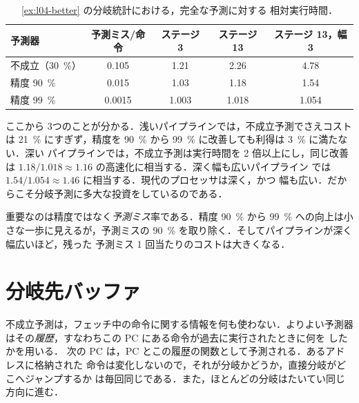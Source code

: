 \documentclass[../main.tex]{subfiles}
\begin{document}
\begin{table}[htbp]
  \centering\small
  \caption{\cref{ex:l04-better} の分岐統計における，完全な予測に対する
    相対実行時間．}
  \label{tab:l04-better}
  \begin{tabular}{@{}lcccc@{}}
    \toprule
    予測器 & 予測ミス/命令 & ステージ 3 & ステージ 13 & ステージ 13，幅 3 \\
    \midrule
    不成立（\SI{30}{\percent}） & 0.105  & 1.21  & 2.26  & 4.78 \\
    精度 \SI{90}{\percent}      & 0.015  & 1.03  & 1.18  & 1.54 \\
    精度 \SI{99}{\percent}      & 0.0015 & 1.003 & 1.018 & 1.054 \\
    \bottomrule
  \end{tabular}
\end{table}

ここから 3つのことが分かる．浅いパイプラインでは，不成立予測でさえコストは
\SI{21}{\percent} にすぎず，精度を \SI{90}{\percent} から
\SI{99}{\percent} に改善しても利得は \SI{3}{\percent} に満たない．深い
パイプラインでは，不成立予測は実行時間を 2 倍以上にし，同じ改善は
$1.18/1.018 \approx 1.16$ の高速化に相当する．深く幅も広いパイプライン
では $1.54/1.054 \approx 1.46$ に相当する．現代のプロセッサは深く，かつ
幅も広い．だからこそ分岐予測に多大な投資をしているのである．

\begin{keypoint}
  重要なのは精度ではなく\emph{予測ミス}率である．精度 \SI{90}{\percent}
  から \SI{99}{\percent} への向上は小さな一歩に見えるが，予測ミスの
  \SI{90}{\percent} を取り除く．そしてパイプラインが深く幅広いほど，残った
  予測ミス 1 回当たりのコストは大きくなる．
\end{keypoint}

\section{分岐先バッファ}
\label{sec:l04-btb}

不成立予測は，フェッチ中の命令に関する情報を何も使わない．よりよい予測器
はその\emph{履歴}，すなわちこの PC にある命令が過去に実行されたときに何を
したかを用いる．%
次の PC は，PC とこの履歴の関数として予測される．あるアドレスに格納された
命令は変化しないので，それが分岐かどうか，直接分岐がどこへジャンプするか
は毎回同じである．また，ほとんどの分岐はたいてい同じ方向に進む．
\end{document}
